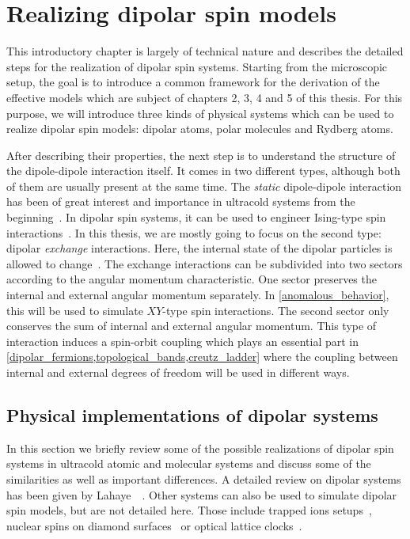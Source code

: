 \chapter{Realizing dipolar spin models}
\label{dipolar_spinmodels}

This introductory chapter is largely of technical nature and describes the detailed steps for
the realization of dipolar spin systems. Starting from the microscopic setup, the goal is to
introduce a common framework for the derivation of the effective models which are subject of
chapters 2, 3, 4 and 5 of this thesis. For this purpose,
we will introduce three kinds of physical systems which can be used to realize dipolar spin
models: dipolar atoms, polar molecules and Rydberg atoms.

After describing their properties, the next step is to understand the structure of the dipole-dipole interaction itself.
It comes in two different types, although both of them are usually present at the same time.
The \emph{static} dipole-dipole interaction has been of great interest and importance in ultracold systems from the beginning~\cite{Goral1999,Santos2000a,Santos2003a,Griesmaier2005a,Stuhler2005,Ronen2007a,Koch2008a,Lahaye2008a,Lahaye2009}.
In dipolar spin systems, it can be used to engineer Ising-type spin interactions~\cite{Micheli2006,Hauke2010,Gorshkov2011,Gorshkov2011b,Peter2012b,Syzranov2014,Peter2014}.
In this thesis, we are mostly going to focus on the second type: dipolar \emph{exchange} interactions.
Here, the internal state of the dipolar particles is allowed to change~\cite{Huber2011,Yan2013,DePaz2013,Hazzard2014,Barredo2014,Syzranov2014}.
The exchange interactions can be subdivided into two sectors according to the angular momentum characteristic.
One sector preserves the internal and external angular momentum separately.
In \cref{anomalous_behavior}, this will be used to simulate $XY$-type spin interactions.
The second sector only conserves the sum of internal and external angular momentum.
This type of interaction induces a spin-orbit coupling which plays an essential part in \cref{dipolar_fermions,topological_bands,creutz_ladder} where the coupling between internal and external degrees of freedom will be used in different ways.

\section{Physical implementations of dipolar systems}

In this section we briefly review some of the possible realizations of dipolar spin
systems in ultracold atomic and molecular systems and discuss some of the similarities
as well as important differences. A detailed review on dipolar systems has been given by Lahaye~\etal~\cite{Lahaye2009}. Other systems can also be used to simulate dipolar spin models, but are not detailed here. Those include trapped ions setups~\cite{Britton2012,Kim2010}, nuclear spins on diamond surfaces~\cite{Cai2012} or optical lattice clocks~\cite{Martin2013}.


